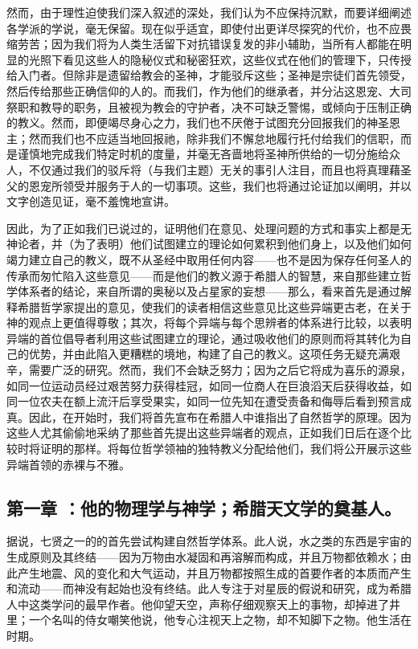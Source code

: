 然而，由于理性迫使我们深入叙述的深处，我们认为不应保持沉默，而要详细阐述各学派的学说，毫无保留。现在似乎适宜，即使付出更详尽探究的代价，也不应畏缩劳苦；因为我们将为人类生活留下对抗错误复发的非小辅助，当所有人都能在明显的光照下看见这些人的隐秘仪式和秘密狂欢，这些仪式在他们的管理下，只传授给入门者。但除非是遗留给教会的圣神，才能驳斥这些；圣神是宗徒们首先领受，然后传给那些正确信仰的人的。而我们，作为他们的继承者，并分沾这恩宠、大司祭职和教导的职务，且被视为教会的守护者，决不可缺乏警惕，或倾向于压制正确的教义。然而，即便竭尽身心之力，我们也不厌倦于试图充分回报我们的神圣恩主；然而我们也不应适当地回报祂，除非我们不懈怠地履行托付给我们的信职，而是谨慎地完成我们特定时机的度量，并毫无吝啬地将圣神所供给的一切分施给众人，不仅通过我们的驳斥将（与我们主题）无关的事引人注目，而且也将真理藉圣父的恩宠所领受并服务于人的一切事项。这些，我们也将通过论证加以阐明，并以文字创造见证，毫不羞愧地宣讲。\par

因此，为了正如我们已说过的，证明他们在意见、处理问题的方式和事实上都是无神论者，并（为了表明）他们试图建立的理论如何累积到他们身上，以及他们如何竭力建立自己的教义，既不从圣经中取用任何内容——也不是因为保存任何圣人的传承而匆忙陷入这些意见——而是他们的教义源于希腊人的智慧，来自那些建立哲学体系者的结论，来自所谓的奥秘以及占星家的妄想——那么，看来首先是通过解释希腊哲学家提出的意见，使我们的读者相信这些意见比这些异端更古老，在关于神的观点上更值得尊敬；其次，将每个异端与每个思辨者的体系进行比较，以表明异端的首位倡导者利用这些试图建立的理论，通过吸收他们的原则而将其转化为自己的优势，并由此陷入更糟糕的境地，构建了自己的教义。这项任务无疑充满艰辛，需要广泛的研究。然而，我们不会缺乏努力；因为之后它将成为喜乐的源泉，如同一位运动员经过艰苦努力获得桂冠，如同一位商人在巨浪滔天后获得收益，如同一位农夫在额上流汗后享受果实，如同一位先知在遭受责备和侮辱后看到预言成真。因此，在开始时，我们将首先宣布在希腊人中谁指出了自然哲学的原理。因为这些人尤其偷偷地采纳了那些首先提出这些异端者的观点，正如我们日后在逐个比较时将证明的那样。将每位哲学领袖的独特教义分配给他们，我们将公开展示这些异端首领的赤裸与不雅。\par


\subsection{第一章 ：他的物理学与神学；希腊天文学的奠基人。}

据说，七贤之一的的首先尝试构建自然哲学体系。此人说，水之类的东西是宇宙的生成原则及其终结——因为万物由水凝固和再溶解而构成，并且万物都依赖水；由此产生地震、风的变化和大气运动，并且万物都按照生成的首要作者的本质而产生和流动——而神没有起始也没有终结。此人专注于对星辰的假说和研究，成为希腊人中这类学问的最早作者。他仰望天空，声称仔细观察天上的事物，却掉进了井里；一个名叫的侍女嘲笑他说，他专心注视天上之物，却不知脚下之物。他生活在时期。\par

